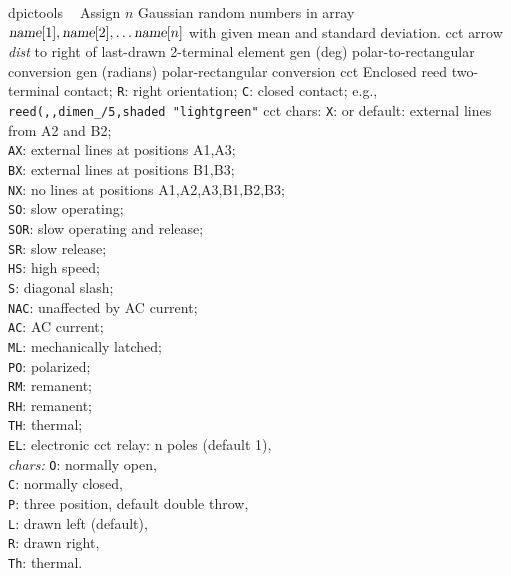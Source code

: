 %

%
  {dpictools}%
  {$\;\;$ Assign $n$ Gaussian random numbers in array
   $\hbox{\sl name}[1], \hbox{\sl name}[2], \ldots \hbox{\sl name}[n]$
   with given mean and standard deviation.}%
%
  {cct}%
  {arrow {\sl dist} to right of last-drawn 2-terminal element
   }%
%
  {gen}%
  {(deg) polar-to-rectangular conversion}%
%
  {gen}%
  {(radians) polar-rectangular conversion}%
%
  {cct}%
  {Enclosed reed two-terminal contact;
   {\tt R}: right orientation; {\tt C}: closed contact; e.g., {\tt
   reed(,{,}dimen\_/5,shaded "lightgreen"} }%
%
  {cct}%
  {chars:
    {\tt X}: or default: external lines from A2 and B2;\\
    {\tt AX}: external lines at positions A1,A3;\\
    {\tt BX}: external lines at positions B1,B3;\\
    {\tt NX}: no lines at positions A1,A2,A3,B1,B2,B3;\\
    {\tt SO}: slow operating;\\
    {\tt SOR}: slow operating and release;\\
    {\tt SR}: slow release;\\
    {\tt HS}: high speed;\\
    {\tt S}:  diagonal slash;\\
    {\tt NAC}: unaffected by AC current;\\
    {\tt AC}: AC current;\\
    {\tt ML}: mechanically latched;\\
    {\tt PO}: polarized;\\
    {\tt RM}: remanent;\\
    {\tt RH}: remanent;\\
    {\tt TH}: thermal;\\
    {\tt EL}: electronic
   }%
%
  {cct}%
  {relay: n poles (default 1),\\
    {\sl chars:} {\tt O}: normally open,\\
    {\tt C}: normally closed,\\
    {\tt P}: three position, default double throw,\\
    {\tt L}: drawn left (default),\\
    {\tt R}: drawn right,\\
    {\tt Th}: thermal.}%

